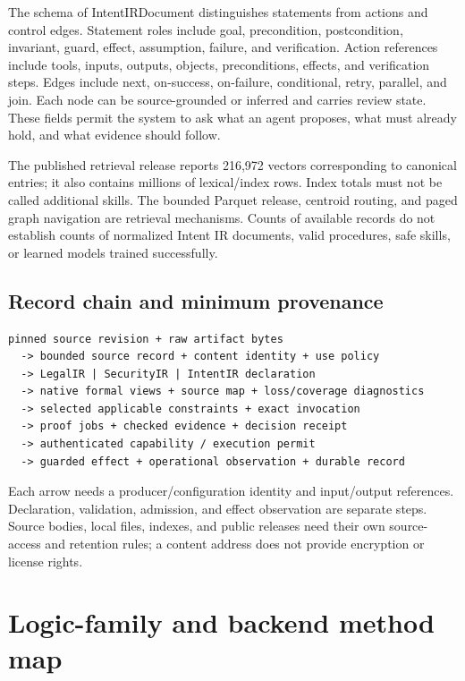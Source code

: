 \documentclass{article}
\begin{document}
The schema of IntentIRDocument distinguishes statements from actions and control edges. Statement roles include goal, precondition, postcondition, invariant, guard, effect, assumption, failure, and verification. Action references include tools, inputs, outputs, objects, preconditions, effects, and verification steps. Edges include next, on-success, on-failure, conditional, retry, parallel, and join. Each node can be source-grounded or inferred and carries review state. These fields permit the system to ask what an agent proposes, what must already hold, and what evidence should follow.

The published retrieval release reports 216,972 vectors corresponding to canonical entries; it also contains millions of lexical/index rows. Index totals must not be called additional skills. The bounded Parquet release, centroid routing, and paged graph navigation are retrieval mechanisms. Counts of available records do not establish counts of normalized Intent IR documents, valid procedures, safe skills, or learned models trained successfully.

\subsection{Record chain and minimum provenance}
\begin{verbatim}
pinned source revision + raw artifact bytes
  -> bounded source record + content identity + use policy
  -> LegalIR | SecurityIR | IntentIR declaration
  -> native formal views + source map + loss/coverage diagnostics
  -> selected applicable constraints + exact invocation
  -> proof jobs + checked evidence + decision receipt
  -> authenticated capability / execution permit
  -> guarded effect + operational observation + durable record
\end{verbatim}

Each arrow needs a producer/configuration identity and input/output references. Declaration, validation, admission, and effect observation are separate steps. Source bodies, local files, indexes, and public releases need their own source-access and retention rules; a content address does not provide encryption or license rights.

\section{Logic-family and backend method map}
\end{document}
